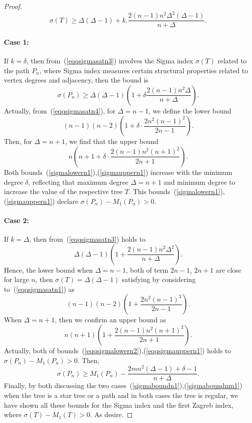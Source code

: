 \documentclass[10pt,a4paper]{amsart}
\newcommand{\case}[1]{\paragraph*{Case #1:}}
\begin{document}
\begin{proof}
\begin{equation}~\label{eqqsigmasatn3}
\sigma(T)\geq \Delta(\Delta-1)+k.\frac{2(n-1)n^2\Delta^2(\Delta-1)}{n+\Delta}.
\end{equation}
\case{1} If $k=\delta$, then from~(\ref{eqqsigmasatn3}) involves the Sigma index $\sigma(T)$ related to the path $P_n$, where Sigma index measures certain structural properties related to vertex degrees and adjacency, then the bound is 
\begin{equation}~\label{eqqsigmasatn4}
\sigma(P_n)\geq \Delta(\Delta-1)\left (1+\delta\frac{2(n-1)n^2\Delta}{n+\Delta}\right).
\end{equation}
Actually, from~(\ref{eqqsigmasatn4}), for $\Delta=n-1$, we define the lower bound
\begin{equation}~\label{sigmalowern1}
    (n - 1)(n - 2) \left( 1 + \delta \cdot \frac{2 n^{2} (n - 1)^{2}}{2 n - 1} \right).
\end{equation}
Then, for $\Delta=n+1$, we find that the upper bound 
\begin{equation}~\label{sigmauppern1}
    n \left( n + 1 + \delta \cdot \frac{2 (n - 1) n^{2} (n + 1)^{2}}{2 n + 1} \right).
\end{equation}
Both bounds~(\ref{sigmalowern1}),(\ref{sigmauppern1}) increase with the minimum degree $\delta$, reflecting that maximum degree $\Delta=n+1$ and minimum degree to increase the value of the respective tree $T$. This bounds~(\ref{sigmalowern1}),(\ref{sigmauppern1}) declare $\sigma(P_n)-M_1(P_n)>0$. 
\case{2} If $k=\Delta$, then from~(\ref{eqqsigmasatn3}) holds to 
\begin{equation}~\label{eqqsigmasatn5}
    \Delta (\Delta - 1) \left( 1 + \frac{2 (n - 1) n^{2} \Delta^{2}}{n + \Delta} \right).
\end{equation}
Hence, the lower bound when $\Delta=n-1$, both of term $2n-1$, $2n+1$ are close for large $n$, then $\sigma(T)= \Delta (\Delta - 1)$ satisfying by considering to~(\ref{eqqsigmasatn1}) as 
\begin{equation}~\label{eqqsigmalowern2}
   (n-1)(n-2)\left( 1 + \frac{2 n^{2} (n - 1)^{3}}{2 n - 1} \right).
\end{equation}
When $\Delta=n+1$, then we confirm an upper bound as
\begin{equation}~\label{eqqsigmauppern1}
   n (n + 1) \left( 1 + \frac{2 (n - 1) n^{2} (n + 1)^{2}}{2 n + 1} \right). 
\end{equation}
Actually, both of bounds~(\ref{eqqsigmalowern2}),(\ref{eqqsigmauppern1}) holds to $\sigma(P_n)-M_1(P_n)>0$. Then, 
\begin{equation}~\label{sigmaboundnm1}
     \sigma(P_n) \geq M_1(P_n)  - \frac{2mn^2(\Delta - 1)+\delta-1}{n+\Delta}.
\end{equation}
Finally, by both discussing the two cases~(\ref{sigmaboundn1}),(\ref{sigmaboundnm1}) when the tree is a star tree or a path and in both cases the tree is regular, we have shown all these bounds for the Sigma index and the first Zagreb index, where $\sigma(T)-M_1(T)>0$. As desire.
\end{proof}
\end{document}
